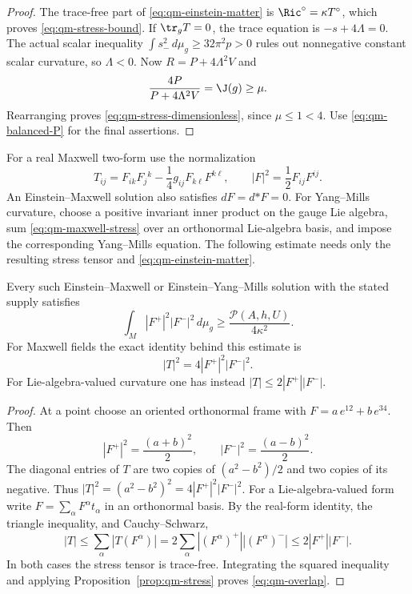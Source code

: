\begin{proof}
The trace-free part of \eqref{eq:qm-einstein-matter} is
$\Ric^\circ=\kappa T^\circ$, which proves
\eqref{eq:qm-stress-bound}.  If $\tr_gT=0$, the trace equation is
$-s+4\Lambda=0$.  The actual scalar inequality
$\int s_-^2\,d\mu_g\ge32\pi^2p>0$ rules out nonnegative constant
scalar curvature, so $\Lambda<0$.  Now $R=P+4\Lambda^2V$ and
\[
 \frac{4P}{P+4\Lambda^2V}=\J(g)\ge\mu.
\]
Rearranging proves \eqref{eq:qm-stress-dimensionless}, since
$\mu\le1<4$.  Use \eqref{eq:qm-balanced-P} for the final assertions.
\end{proof}

For a real Maxwell two-form use the normalization
\begin{equation}\label{eq:qm-maxwell-stress}
 T_{ij}=F_{ik}F_j{}^k-\frac14g_{ij}F_{k\ell}F^{k\ell},
 \qquad |F|^2=\frac12F_{ij}F^{ij}.
\end{equation}
An Einstein--Maxwell solution also satisfies $dF=d{*F}=0$.
For Yang--Mills curvature, choose a positive invariant inner product on
the gauge Lie algebra, sum \eqref{eq:qm-maxwell-stress} over an
orthonormal Lie-algebra basis, and impose the corresponding Yang--Mills
equation.  The following estimate needs only the resulting stress tensor
and \eqref{eq:qm-einstein-matter}.

\begin{corollary}\label{cor:qm-overlap}
Every such Einstein--Maxwell or Einstein--Yang--Mills solution with the
stated supply satisfies
\begin{equation}\label{eq:qm-overlap}
 \int_M|F^+|^2|F^-|^2\,d\mu_g
 \ge\frac{\mathscr P(A,h,U)}{4\kappa^2}.
\end{equation}
For Maxwell fields the exact identity behind this estimate is
\begin{equation}\label{eq:qm-maxwell-identity}
 |T|^2=4|F^+|^2|F^-|^2.
\end{equation}
For Lie-algebra-valued curvature one has instead
$|T|\le2|F^+||F^-|$.
\end{corollary}

\begin{proof}
At a point choose an oriented orthonormal frame with
$F=a\,e^{12}+b\,e^{34}$.  Then
\[
 |F^+|^2=\frac{(a+b)^2}{2},\qquad
 |F^-|^2=\frac{(a-b)^2}{2}.
\]
The diagonal entries of $T$ are two copies of $(a^2-b^2)/2$ and two
copies of its negative.  Thus
$|T|^2=(a^2-b^2)^2=4|F^+|^2|F^-|^2$.
For a Lie-algebra-valued form write $F=\sum_\alpha F^\alpha t_\alpha$
in an orthonormal basis.  By the real-form identity, the triangle
inequality, and Cauchy--Schwarz,
\[
 |T|\le\sum_\alpha|T(F^\alpha)|
 =2\sum_\alpha|(F^\alpha)^+||(F^\alpha)^-|
 \le2|F^+||F^-|.
\]
In both cases the stress tensor is trace-free.  Integrating the squared
inequality and applying Proposition~\ref{prop:qm-stress} proves
\eqref{eq:qm-overlap}.
\end{proof}

